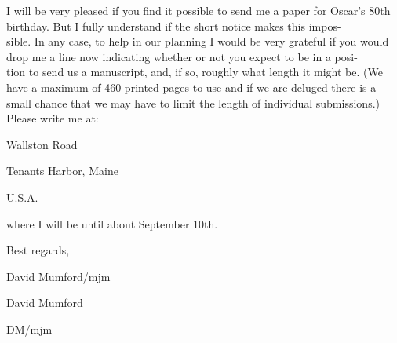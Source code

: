 I will be very pleased if you find it possible to send me a paper for Oscar's
80th birthday. But I fully understand if the short notice makes this impos-\\
sible. In any case, to help in our planning I would be very grateful if you
would drop me a line now indicating whether or not you expect to be in a posi-\\
tion to send us a manuscript, and, if so, roughly what length it might be.
(We have a maximum of 460 printed pages to use and if we are deluged there is
a small chance that we may have to limit the length of individual submissions.)
Please write me at:

Wallston Road

Tenants Harbor, Maine

U.S.A.

where I will be until about September 10th.

Best regards,

David Mumford/mjm

David Mumford

DM/mjm
